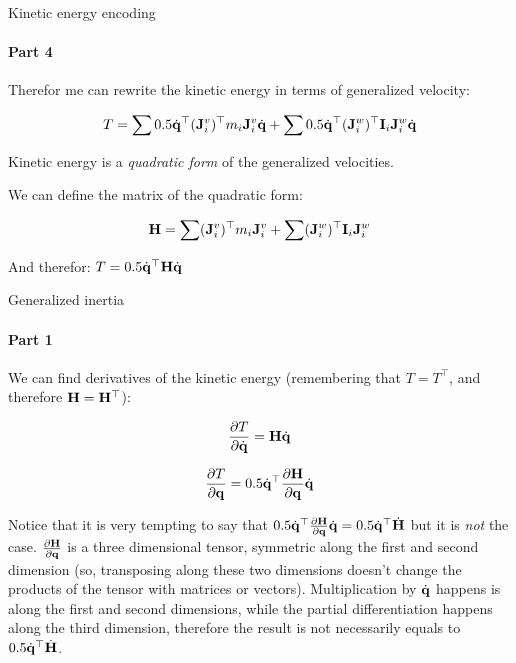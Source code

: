 \documentclass{beamer}
\begin{document}
\begin{frame}{Kinetic energy encoding}
\framesubtitle{Part 4}
\begin{flushleft}


Therefor me can rewrite the kinetic energy in terms of generalized velocity:

\begin{equation}
    T = \sum 0.5 \dot{\mathbf{q}}^\top (\mathbf{J}^v_i)^\top m_i \mathbf{J}^v_i \dot{\mathbf{q}} 
    + 
    \sum 0.5 \dot{\mathbf{q}}^\top (\mathbf{J}^w_i)^\top \mathbf{I}_i \mathbf{J}^w_i \dot{\mathbf{q}} 
\end{equation}

Kinetic energy is a \emph{quadratic form} of the generalized velocities.

We can define the matrix of the quadratic form:

\begin{equation}
\label{eq:JSIM}
    \mathbf{H} = \sum (\mathbf{J}^v_i)^\top m_i \mathbf{J}^v_i 
    + 
    \sum (\mathbf{J}^w_i)^\top \mathbf{I}_i \mathbf{J}^w_i 
\end{equation}

\bigskip

And therefor: $T = 0.5 \dot{\mathbf{q}}^\top \mathbf{H} \dot{\mathbf{q}}$

\end{flushleft}
\end{frame}




\begin{frame}{Generalized inertia}
\framesubtitle{Part 1}
\begin{flushleft}


We can find derivatives of the kinetic energy (remembering that $T = T^\top$, and therefore $\mathbf{H} = \mathbf{H}^\top$):

\begin{equation}
    \frac{\partial T }{\partial \dot{\mathbf{q}}} = 
     \mathbf{H} \dot{\mathbf{q}}
\end{equation}

\begin{equation}
    \frac{\partial T }{\partial \mathbf{q}} = 
     0.5 \dot{\mathbf{q}}^\top \frac{\partial \mathbf{H} }
     {\partial \mathbf{q}} \dot{\mathbf{q}}
\end{equation}


Notice that it is very tempting to say that $0.5 \dot{\mathbf{q}}^\top \frac{\partial \mathbf{H} }
     {\partial \mathbf{q}} \dot{\mathbf{q}}
     =
     0.5 \dot{\mathbf{q}}^\top \dot{ \mathbf{H} }$ but it is \emph{not} the case. $\frac{\partial \mathbf{H} }
     {\partial \mathbf{q}}$ is a three dimensional tensor, symmetric along the first and second dimension (so, transposing along these two dimensions doesn't change the products of the tensor with matrices or vectors). Multiplication by $\dot{\mathbf{q}}$ happens is along the first and second dimensions, while the partial differentiation happens along the third dimension, therefore the result is not necessarily equals to $0.5 \dot{\mathbf{q}}^\top \dot{ \mathbf{H} }$. 

\end{flushleft}
\end{frame}
\end{document}
